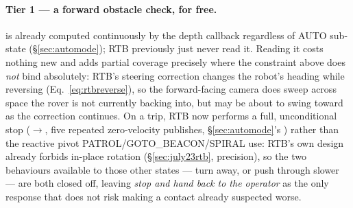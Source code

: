 \paragraph{Tier 1 — a forward obstacle check, for free.} 
is already computed continuously by the depth callback regardless of AUTO
sub-state (\S\ref{sec:automode}); RTB previously just never read it. Reading
it costs nothing new and adds partial coverage precisely where the constraint
above does \emph{not} bind absolutely: RTB's steering correction changes the
robot's heading while reversing (Eq.~\ref{eq:rtbreverse}), so the
forward-facing camera does sweep across space the rover is not currently
backing into, but may be about to swing toward as the correction continues.
On a trip, RTB now performs a full, unconditional stop
($\to$, five repeated zero-velocity publishes,
\S\ref{sec:automode}'s ) rather than the reactive pivot
PATROL/GOTO\_BEACON/SPIRAL use: RTB's own design already forbids in-place
rotation (\S\ref{sec:july23rtb}, precision), so the two behaviours available
to those other states — turn away, or push through slower — are both closed
off, leaving \emph{stop and hand back to the operator} as the only
response that does not risk making a contact already suspected worse.


